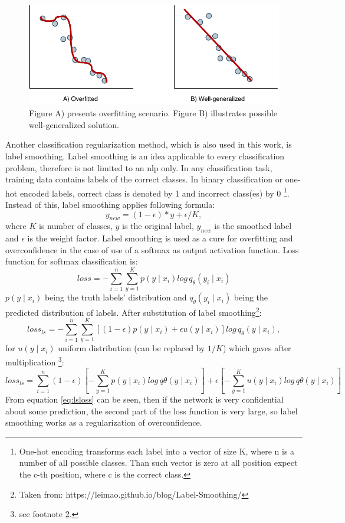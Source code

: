 \begin{figure}[ht]
\centering
\includegraphics[width=0.7\columnwidth]{../img/overfitting}
\caption{Figure A) presents overfitting scenario. Figure B) illustrates possible well-generalized solution. }
\label{pic:overfitting}
\end{figure}
Another classification regularization method, which is also used in this work, is label smoothing. Label smoothing \citep{Szegedy2015} is an idea applicable to every classification problem, therefore is not limited to an \acrshort{nlp} only.
In any classification task, training data contains labels of the correct classes. In binary classification or one-hot encoded labels, correct class is denoted by 1 and incorrect class(es) by 0 \footnote{One-hot encoding transforms each label into a vector of size K, where n is a number of all possible classes. Than such vector is zero at all position expect the c-th position, where c is the correct class.}. Instead of this, label smoothing applies following formula: 
$$y_{new} = (1 - \epsilon) * y + \epsilon / K,$$ where $K$ is number of classes, $y$ is the original label, $y_{new}$ is the smoothed label and $\epsilon$ is the weight factor. Label smoothing is used as a cure for overfitting and overconfidence in the case of use of a softmax as output activation function. Loss function for softmax classification is: 
 $$ loss = -\sum_{i=1}^{n} \sum_{y=1}^{K} p(y \mid x_i) log \, q_{\theta} ( y_i \mid x_i ) $$
 $p(y \mid x_i)$ being the truth labels' distribution and $q_{\theta} ( y_i \mid x_i )$ being the predicted distribution of labels. After substitution of label smoothing\footnote{\label{note1} Taken from: https://leimao.github.io/blog/Label-Smoothing/}:
$$
loss_{ls} = -\sum_{i=1}^{n} \sum_{y=1}^{K} [(1-\epsilon) p(y \mid x_i)+\epsilon u(y\mid x_i)]log \, q_\theta(y \mid x_i), $$
for $u(y\mid x_i)$ uniform distribution (can be replaced by $1/K$)
which gaves after multiplication \footnote{see footnote \ref{note1}.}:
 \begin{equation} \label{eq:lsloss}
 loss_{ls}= \sum_{i=1}^{n} {(1- \epsilon)[- \sum_{y=1}^{K} p(y\mid x_i) log \, q\theta(y \mid x_i)]+\epsilon [- \sum_{y=1}^{K} u(y \mid x_i)log \, q\theta (y\mid x_i)]}
 \end{equation}
From equation \ref{eq:lsloss} can be seen, then if the network is very confidential about some prediction, the second part of the loss function is very large, so label smoothing works as a regularization of overconfidence.

